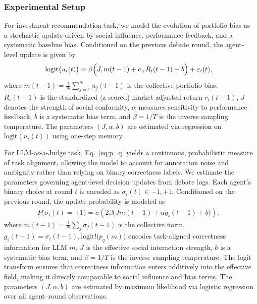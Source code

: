 \documentclass{article}
\theoremstyle{plain}
\theoremstyle{definition}
\theoremstyle{remark}
\begin{document}
\subsubsection{Experimental Setup}\label{app:real_setup}
For investment recommendation task, we model the evolution of portfolio bias as a stochastic update driven by social influence, performance feedback, and a systematic baseline bias.
Conditioned on the previous debate round, the agent-level update is given by
\begin{equation}
\mathrm{logit}\bigl(u_i(t)\bigr)
= \beta \Bigl( J,m(t-1) + \alpha,R_i(t-1) + b \Bigr) + \varepsilon_i(t),
\end{equation}
where $m(t-1) = \frac{1}{N} \sum_{j=1}^N u_j(t-1)$ is the collective portfolio bias, $R_i(t-1)$ is the standardized (z-scored) market-adjusted return $r_i(t-1)$, $J$ denotes the strength of social conformity, $\alpha$ measures sensitivity to performance feedback, $b$ is a systematic bias term, and $\beta = 1/T$ is the inverse sampling temperature.
The parameters $(J,\alpha,b)$ are estimated via regression on $\mathrm{logit}(u_i(t))$ using one-step memory.

For LLM-as-a-Judge task, Eq.~\eqref{eq:p_q} yields a continuous, probabilistic measure of task alignment, allowing the model to account for annotation noise and ambiguity rather than relying on binary correctness labels.
We estimate the parameters governing agent-level decision updates from debate logs.
Each agent’s binary choice at round $t$ is encoded as $\sigma_i(t)\in{-1,+1}$. Conditioned on the previous round, the update probability is modeled as
\begin{align}
P\bigl(\sigma_i(t)=+1\bigr)
= \sigma\left( 2\beta\bigl(J m(t-1) + \alpha g_i(t-1) + b\bigr) \right),
\end{align}
where $m(t-1)=\frac{1}{N}\sum_j \sigma_j(t-1)$ is the collective norm,
$g_i(t-1) = \sigma_i(t-1),\mathrm{logit}!\bigl(p_q(m)\bigr)$ encodes task-aligned correctness information for LLM $m$, $J$ is the effective social interaction strength,
$b$ is a systematic bias term, and $\beta=1/T$ is the inverse sampling temperature.
The logit transform ensures that correctness information enters additively into the effective field, making it directly comparable to social influence and bias terms. The parameters $(J,\alpha,b)$ are estimated by maximum likelihood via logistic regression over all agent--round observations.
\end{document}
